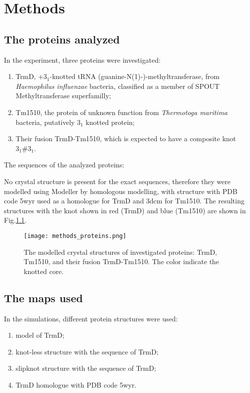 \chapter{Methods}
\label{chap:methods}

\section{The proteins analyzed}
\label{sec:methods_proteins}
In the experiment, three proteins were investigated:
\begin{enumerate}
    \item TrmD, $+3_1$-knotted tRNA (guanine-N(1)-)-methyltransferase, from \textit{Haemophilus influenzae} bacteria, classified as a member of SPOUT Methyltransferase superfamilly;
    \item Tm1510, the protein of unknown function from \textit{Thermotoga maritima} bacteria, putatively $3_1$ knotted protein;
    \item Their fusion TrmD-Tm1510, which is expected to have a composite knot $3_1 \# 3_1$.
\end{enumerate}
The sequences of the analyzed proteins:

No crystal structure is present for the exact sequences, therefore they were modelled using Modeller by homologous modelling, with structure with PDB code 5wyr used as a homologue for TrmD and 3dcm for Tm1510.
The resulting structures with the knot shown in red (TrmD) and blue (Tm1510) are shown in Fig.\ref{fig:methods_proteins}.

\begin{figure}
    \texttt{[image: methods\_proteins.png]}
    \caption{The modelled crystal structures of investigated proteins: TrmD, Tm1510, and their fusion TrmD-Tm1510.
    The color indicate the knotted core.}
    \label{fig:methods_proteins}
\end{figure}

\section{The maps used}
\label{sec:methods_maps}
In the simulations, different protein structures were used:
\begin{enumerate}
    \item model of TrmD;
    \item knot-less structure with the sequence of TrmD;
    \item slipknot structure with the sequence of TrmD;
    \item TrmD homologue with PDB code 5wyr.
\end{enumerate}


